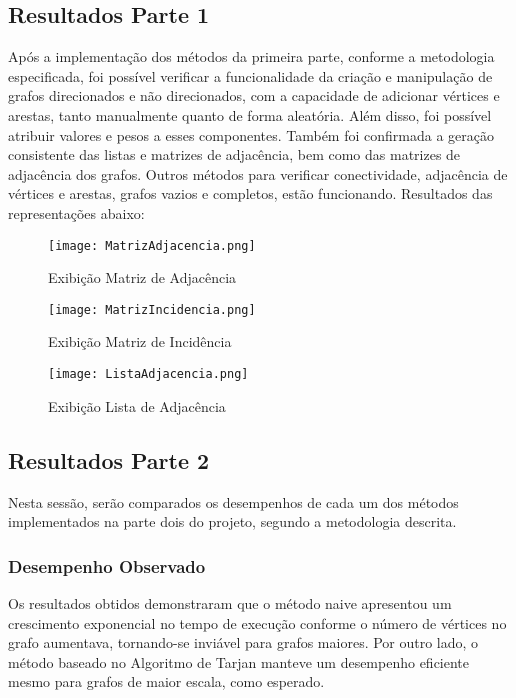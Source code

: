 \documentclass[12pt]{article}
\begin{document}
\subsection{Resultados Parte 1}

Após a implementação dos métodos da primeira parte, conforme a metodologia especificada, foi possível verificar a funcionalidade da criação e manipulação de grafos direcionados e não direcionados, com a capacidade de adicionar vértices e arestas, tanto manualmente quanto de forma aleatória. Além disso, foi possível atribuir valores e pesos a esses componentes. Também foi confirmada a geração consistente das listas e matrizes de adjacência, bem como das matrizes de adjacência dos grafos. Outros métodos para verificar conectividade, adjacência de vértices e arestas, grafos vazios e completos, estão funcionando. Resultados das representações abaixo:

\begin{figure}[ht]
\centering
\texttt{[image: MatrizAdjacencia.png]}
\caption{Exibição Matriz de Adjacência}
\label{fig:exampleFig1}
\end{figure}

\begin{figure}[ht]
\centering
\texttt{[image: MatrizIncidencia.png]}
\caption{Exibição Matriz de Incidência}
\label{fig:exampleFig1}
\end{figure}

\begin{figure}[ht]
\centering
\texttt{[image: ListaAdjacencia.png]}
\caption{Exibição Lista de Adjacência}
\label{fig:exampleFig1}
\end{figure}


\clearpage

\subsection{Resultados Parte 2}

Nesta sessão, serão comparados os desempenhos de cada um dos métodos implementados na parte dois do projeto, segundo a metodologia descrita.

\subsubsection{Desempenho Observado}
Os resultados obtidos demonstraram que o método naive apresentou um crescimento exponencial no tempo de execução conforme o número de vértices no grafo aumentava, tornando-se inviável para grafos maiores. Por outro lado, o método baseado no Algoritmo de Tarjan manteve um desempenho eficiente mesmo para grafos de maior escala, como esperado.
\end{document}
